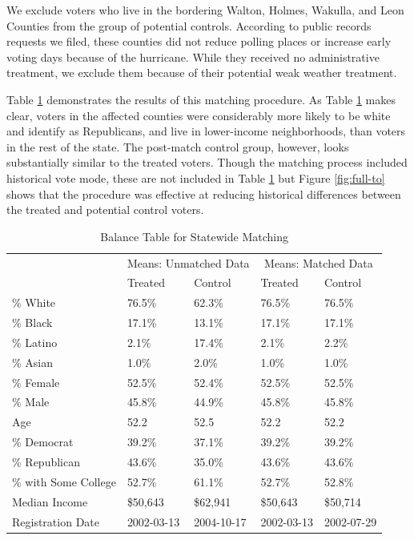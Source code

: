 \documentclass[
  12pt,
]{article}
\begin{document}
We exclude voters who live in the bordering Walton, Holmes, Wakulla, and Leon Counties from the group of potential controls. According to public records requests we filed, these counties did not reduce polling places or increase early voting days because of the hurricane. While they received no administrative treatment, we exclude them because of their potential weak weather treatment.

Table \ref{tab:full-bal} demonstrates the results of this matching procedure. As Table \ref{tab:full-bal} makes clear, voters in the affected counties were considerably more likely to be white and identify as Republicans, and live in lower-income neighborhoods, than voters in the rest of the state. The post-match control group, however, looks substantially similar to the treated voters. Though the matching process included historical vote mode, these are not included in Table \ref{tab:full-bal} but Figure \ref{fig:full-to} shows that the procedure was effective at reducing historical differences between the treated and potential control voters.

\begin{singlespace}
\begin{table}[!h]

\caption{\label{tab:balance-tab-full}\label{tab:full-bal} Balance Table for Statewide Matching}
\centering
\begin{tabular}[t]{lllll}
\toprule
\multicolumn{1}{c}{ } & \multicolumn{2}{c}{Means: Unmatched Data} & \multicolumn{2}{c}{Means: Matched Data} \\
\cmidrule(l{3pt}r{3pt}){2-3} \cmidrule(l{3pt}r{3pt}){4-5}
 & Treated & Control & Treated & Control\\
\midrule
\% White & 76.5\% & 62.3\% & 76.5\% & 76.5\%\\
\% Black & 17.1\% & 13.1\% & 17.1\% & 17.1\%\\
\% Latino & 2.1\% & 17.4\% & 2.1\% & 2.2\%\\
\% Asian & 1.0\% & 2.0\% & 1.0\% & 1.0\%\\
\% Female & 52.5\% & 52.4\% & 52.5\% & 52.5\%\\
\% Male & 45.8\% & 44.9\% & 45.8\% & 45.8\%\\
Age & 52.2 & 52.5 & 52.2 & 52.2\\
\% Democrat & 39.2\% & 37.1\% & 39.2\% & 39.2\%\\
\% Republican & 43.6\% & 35.0\% & 43.6\% & 43.6\%\\
\% with Some College & 52.7\% & 61.1\% & 52.7\% & 52.8\%\\
Median Income & \$50,643 & \$62,941 & \$50,643 & \$50,714\\
Registration Date & 2002-03-13 & 2004-10-17 & 2002-03-13 & 2002-07-29\\
\bottomrule
\end{tabular}
\end{table}
\end{singlespace}
\end{document}
